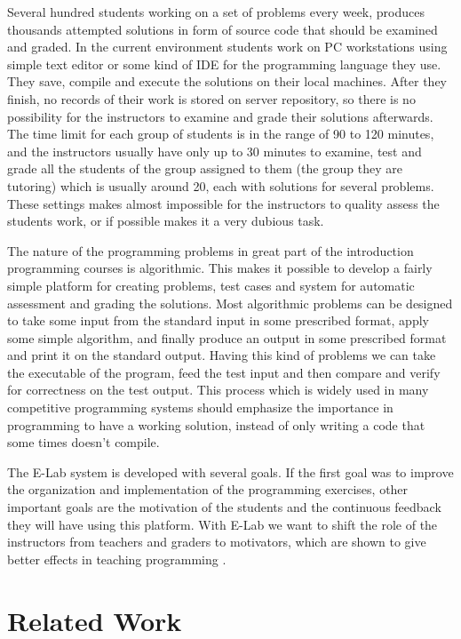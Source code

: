 \documentclass{llncs}
\begin{document}
Several hundred students working on a set of problems every week, produces
thousands attempted solutions in form of source code that should be examined and
graded. In the current environment students work on PC workstations using simple
text editor or some kind of IDE for the programming language they use. They
save, compile and execute the solutions on their local machines. After they
finish, no records of their work is stored on server repository, so there is no
possibility for the instructors to examine and grade their solutions afterwards.
The time limit for each group of students is in the range of 90 to 120 minutes,
and the instructors usually have only up to 30 minutes to examine, test and
grade all the students of the group assigned to them (the group they are
tutoring) which is usually around 20, each with solutions for several problems.
These settings makes almost impossible for the instructors to quality assess the
students work, or if possible makes it a very dubious task.

The nature of the programming problems in great part of the introduction
programming courses is algorithmic. This makes it possible to develop a fairly
simple platform for creating problems, test cases and system for automatic
assessment and grading the solutions. Most algorithmic problems can be designed
to take some input from the standard input in some prescribed format, apply some
simple algorithm, and finally produce an output in some prescribed format and
print it on the standard output. Having this kind of problems we can take the
executable of the program, feed the test input and then compare and verify for
correctness on the test output. This process which is widely used in many
competitive programming systems should emphasize the importance in programming
to have a working solution, instead of only writing a code that some times
doesn't compile.

The E-Lab system is developed with several goals. If the first goal was to
improve the organization and implementation of the programming exercises, other
important goals are the motivation of the students and the continuous feedback
they will have using this platform. With E-Lab we want to shift the role of the
instructors from teachers and graders to motivators, which are shown to give
better effects in teaching programming \cite{jenkins2001teaching}.

\section{Related Work}
\end{document}
